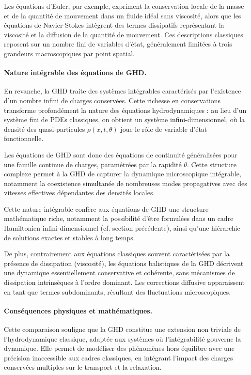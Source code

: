 Les équations d’Euler, par exemple, expriment la conservation locale de la masse et de la quantité de mouvement dans un fluide idéal sans viscosité, alors que les équations de Navier-Stokes intègrent des termes dissipatifs représentant la viscosité et la diffusion de la quantité de mouvement. Ces descriptions classiques reposent sur un nombre fini de variables d’état, généralement limitées à trois grandeurs macroscopiques par point spatial.

\paragraph{Nature intégrable des équations de GHD.}
En revanche, la GHD traite des systèmes intégrables caractérisés par l’existence d’un nombre infini de charges conservées. Cette richesse en conservations transforme profondément la nature des équations hydrodynamiques : au lieu d’un système fini de PDEs classiques, on obtient un système infini-dimensionnel, où la densité des quasi-particules $\rho(x,t,\theta)$ joue le rôle de variable d’état fonctionnelle.

Les équations de GHD sont donc des équations de continuité généralisées pour une famille continue de charges, paramétrées par la rapidité $\theta$. Cette structure complexe permet à la GHD de capturer la dynamique microscopique intégrable, notamment la coexistence simultanée de nombreuses modes propagatives avec des vitesses effectives dépendantes des densités locales.

Cette nature intégrable confère aux équations de GHD une structure mathématique riche, notamment la possibilité d’être formulées dans un cadre Hamiltonien infini-dimensionnel (cf. section précédente), ainsi qu’une hiérarchie de solutions exactes et stables à long temps.

De plus, contrairement aux équations classiques souvent caractérisées par la présence de dissipation (viscosité), les équations balistiques de la GHD décrivent une dynamique essentiellement conservative et cohérente, sans mécanismes de dissipation intrinsèques à l’ordre dominant. Les corrections diffusive apparaissent en tant que termes subdominants, résultant des fluctuations microscopiques.

\paragraph{Conséquences physiques et mathématiques.}
Cette comparaison souligne que la GHD constitue une extension non triviale de l’hydrodynamique classique, adaptée aux systèmes où l’intégrabilité gouverne la dynamique. Elle permet de modéliser des phénomènes hors équilibre avec une précision inaccessible aux cadres classiques, en intégrant l’impact des charges conservées multiples sur le transport et la relaxation.

